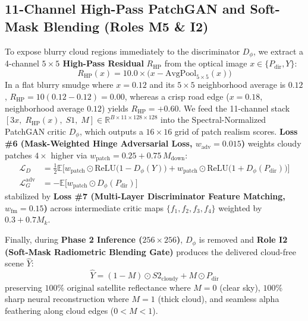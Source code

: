 \documentclass[12pt,a4paper]{report}
\begin{document}
\subsection{11-Channel High-Pass PatchGAN and Soft-Mask Blending (Roles M5 \& I2)}
To expose blurry cloud regions immediately to the discriminator $D_{\phi}$, we extract a 4-channel \textbf{$5\times 5$ High-Pass Residual} $R_{\text{HP}}$ from the optical image $x \in \{P_{\text{dir}}, Y\}$:
\begin{equation}
    R_{\text{HP}}(x) = 10.0 \times \Big(x - \text{AvgPool}_{5\times 5}(x)\Big)
    \label{eq:highpass}
\end{equation}
In a flat blurry smudge where $x = 0.12$ and its $5\times 5$ neighborhood average is $0.12$, $R_{\text{HP}} = 10(0.12 - 0.12) = \mathbf{0.00}$, whereas a crisp road edge ($x=0.18$, neighborhood average $0.12$) yields $R_{\text{HP}} = \mathbf{+0.60}$. We feed the 11-channel stack $[3x,\; R_{\text{HP}}(x),\; S1,\; M] \in \mathbb{R}^{B\times 11\times 128\times 128}$ into the Spectral-Normalized PatchGAN critic $D_{\phi}$, which outputs a $16\times 16$ grid of patch realism scores. \textbf{Loss \#6 (Mask-Weighted Hinge Adversarial Loss, $w_{\text{adv}} = 0.015$)} weights cloudy patches $4\times$ higher via $w_{\text{patch}} = 0.25 + 0.75\,M_{\text{down}}$:
\begin{align}
    \mathcal{L}_D &= \frac{1}{2}\mathbb{E}\Big[w_{\text{patch}}\odot\text{ReLU}\big(1 - D_{\phi}(Y)\big) + w_{\text{patch}}\odot\text{ReLU}\big(1 + D_{\phi}(P_{\text{dir}})\big)\Big] \\
    \mathcal{L}_G^{\text{adv}} &= -\mathbb{E}\Big[w_{\text{patch}}\odot D_{\phi}(P_{\text{dir}})\Big]
\end{align}
stabilized by \textbf{Loss \#7 (Multi-Layer Discriminator Feature Matching, $w_{\text{fm}} = 0.15$)} across intermediate critic maps $\{f_1, f_2, f_3, f_4\}$ weighted by $0.3 + 0.7M_k$.

Finally, during \textbf{Phase 2 Inference ($256\times 256$)}, $D_{\phi}$ is removed and \textbf{Role I2 (Soft-Mask Radiometric Blending Gate)} produces the delivered cloud-free scene $\hat{Y}$:
\begin{equation}
    \hat{Y} = (1 - M)\odot S2_{\text{cloudy}} + M\odot P_{\text{dir}}
    \label{eq:blend}
\end{equation}
preserving $100\%$ original satellite reflectance where $M=0$ (clear sky), $100\%$ sharp neural reconstruction where $M=1$ (thick cloud), and seamless alpha feathering along cloud edges ($0 < M < 1$).
\end{document}
